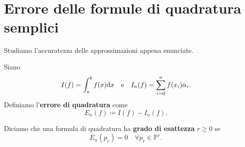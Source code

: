 \section{Errore delle formule di quadratura semplici}
Studiamo l'accuratezza delle approssimazioni appena enunciate.
\begin{definition}
Siano
$$
  I(f) =\int ^{b}_{a} f(x) \mathrm d x
  \quad \text{e} \quad
  I_{n}(f) =\sum\limits ^{n}_{i=0} f( x_{i}) \alpha _{i}.
$$
Definiamo l'\textbf{errore di quadratura} come
\begin{equation*}
E_{n}(f) \coloneqq I(f) -I_{n}(f).
\end{equation*}
\end{definition}
\begin{definition}
Diciamo che una formula di quadratura ha \textbf{grado di esattezza} $r\geqslant 0$ se
\begin{equation*}
E_{n}( p_{r}) =0\quad \forall p_{r} \in \mathbb{P}^{r}.
\end{equation*}
\end{definition}

